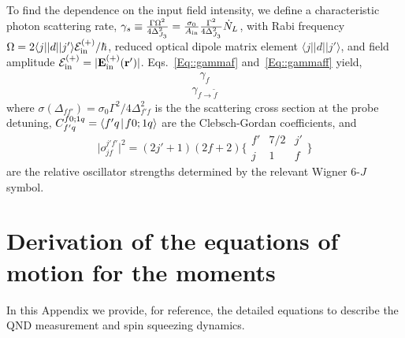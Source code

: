 \documentclass[preprint,aps,pra,onecolumn,superscriptaddress]{revtex4-1} %
\def\br{\mathbf{r}}
\def\bra#1{\langle{#1}\rvert}%
\def\ket#1{\lvert{#1}\rangle}%
\def\Braket#1#2{\mathinner{\langle{#1}\! \mid\! {#2} \rangle}}
\newcommand{\mbf}[1]{\mathbf{#1}}
\newcommand{\inp}{{\rm in}}
\begin{document}
\begin{appendix}
To find the dependence on the input field intensity, we define a characteristic photon scattering rate, $\gamma_s \equiv \frac{\Gamma\Omega^2}{4\Delta_{J_3}^2}= \frac{\sigma_0}{A_{\rm in}}\frac{\Gamma^2}{4 \Delta_{J_3}^2} \dot{N}_L $, with Rabi frequency $ \Omega=2\bra{j}|d|\ket{j'}\mathcal{E}^{(+)}_{\rm in}/\hbar $, reduced optical dipole matrix element $\bra{j}|d|\ket{j'}$, and field amplitude $ \mathcal{E}^{(+)}_{\rm in}=|\mathbf{E}_{\rm in}^{(+)}(\br')| $.
Eqs.~\eqref{Eq::gammaf} and~\eqref{Eq::gammaff} yield,
\begin{subequations}
	\begin{align}
		\gamma_f 
	\end{align}
\end{subequations}
	\begin{align}
		\gamma_{f \rightarrow \tilde{f}}
	\end{align}
where $ \sigma (\Delta_{ff'} )  = \sigma_0 \Gamma^2/4\Delta^2_{f' f}$ is the the scattering cross section at the probe detuning, $ C_{f'q}^{f0;1 q}=\Braket{f'q}{f0;1q}$ are the Clebsch-Gordan coefficients, and
\begin{equation}
\big| o_{jf}^{j'f'} \big|^2=(2j'+1)(2f+2) \bigg\{
\begin{array}{ccc}
f' & 7/2 & j' \\
 j & 1 & f
 \end{array}
 \bigg\}
\end{equation}
are the relative oscillator strengths determined by the relevant Wigner 6-$J$ symbol.

\section{Derivation of the equations of motion for the moments} \label{Appendix::OpticalPumping}

In this Appendix we provide, for reference, the detailed equations to describe the QND measurement and spin squeezing dynamics.


\end{appendix}
\end{document}
